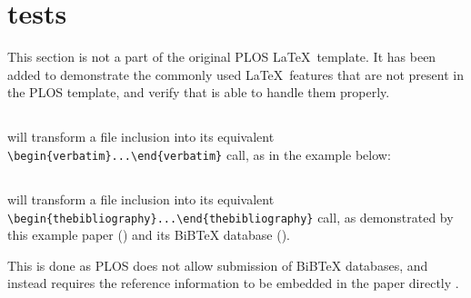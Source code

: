 \section*{ tests}

This section is not a part of the original PLOS \LaTeX~template.
It has been added to demonstrate the commonly used \LaTeX~features that are not present in the PLOS template, and verify that  is able to handle them properly.

\subsection*{}

 will transform a \verb|| file inclusion into its equivalent \verb|\begin{verbatim}...\end{verbatim}| call, as in the example below:



\subsection*{}

 will transform a \verb|| file inclusion into its equivalent \verb|\begin{thebibliography}...\end{thebibliography}| call, as demonstrated by this example paper () and its BiBTeX database ().

This is done as PLOS does not allow submission of BiBTeX databases, and instead requires the reference information to be embedded in the paper directly \cite{PLOS:LaTeX}.
